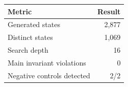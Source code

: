 \begin{tabular}{lr}
\toprule
Metric & Result \\
\midrule
Generated states & 2,877 \\
Distinct states & 1,069 \\
Search depth & 16 \\
Main invariant violations & 0 \\
Negative controls detected & 2/2 \\
\bottomrule
\end{tabular}
